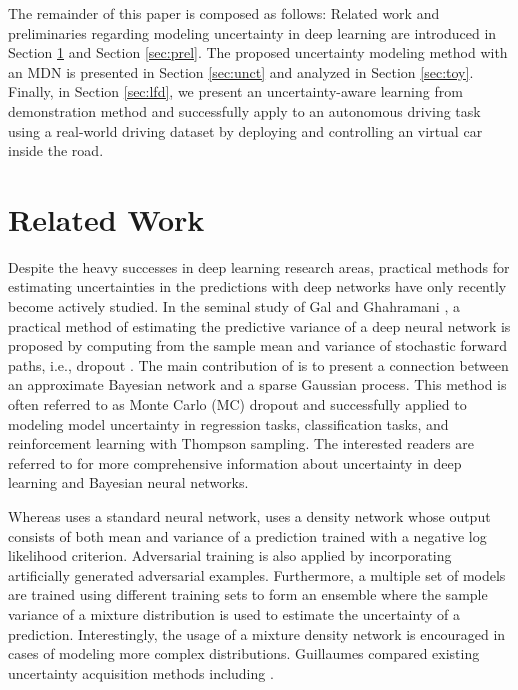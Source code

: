 \documentclass[letterpaper, 10 pt, conference]{ieeeconf}  %
\begin{document}
The remainder of this paper is composed as follows: 
Related work and preliminaries regarding modeling uncertainty
in deep learning are introduced in 
Section \ref{sec:rel} and Section \ref{sec:prel}. 
The proposed uncertainty modeling method with an MDN
is presented in Section \ref{sec:unct} and 
analyzed in Section \ref{sec:toy}.
Finally, in Section \ref{sec:lfd}, we present an uncertainty-aware
learning from demonstration method 
and successfully apply to an autonomous driving task 
using a real-world driving dataset by deploying and controlling
an virtual car inside the road. 



\section{Related Work}\label{sec:rel}

Despite the heavy successes in deep learning research areas,
practical methods for estimating uncertainties 
in the predictions with deep networks
have only recently become actively studied.
In the seminal study of Gal and Ghahramani \cite{Gal_16},
a practical method of estimating the predictive variance 
of a deep neural network is proposed by
computing from the sample mean and variance of
stochastic forward paths, i.e., dropout \cite{Srivastava_14}.
The main contribution of \cite{Gal_16} 
is to present a connection between 
an approximate Bayesian network
and a sparse Gaussian process.
This method is often referred to as Monte Carlo (MC) dropout
and successfully applied to modeling model uncertainty in 
regression tasks, classification tasks, 
and reinforcement learning with Thompson sampling. 
The interested readers are referred to \cite{Gal_16_thesis}
for more comprehensive information about uncertainty
in deep learning and Bayesian neural networks. 


Whereas \cite{Gal_16} uses a standard neural network, 
\cite{Lakshminarayanan_16} uses
a density network whose output consists 
of both mean and variance of a prediction
trained with a negative log likelihood criterion. 
Adversarial training is also applied by incorporating
artificially generated adversarial examples.
Furthermore, a multiple set of models are trained using
different training sets to form an ensemble where 
the sample variance of a mixture distribution is used
to estimate the uncertainty of a prediction.
Interestingly, the usage of a mixture density network is
encouraged in cases of modeling more complex distributions.
Guillaumes \cite{Brando_17}
compared existing uncertainty acquisition 
methods including \cite{Lakshminarayanan_16, Gal_16}.
\end{document}
